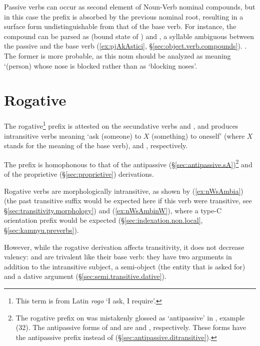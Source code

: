 Passive verbs can occur as second element of Noun-Verb nominal compounds, but in this case the  prefix is absorbed by the previous nominal root, resulting in a surface form undistinguishable from that of the base verb. For instance, the compound  can be parsed as  (bound state of  ) and , a syllable ambiguous between the passive  and the base verb   (\ref{ex:pjAkAstici}, §\ref{sec:object.verb.compounds}). . The former is more probable, as this noun should be analyzed as meaning `(person) whose nose is blocked rather than as `blocking noses'.
 
\section{Rogative} \label{sec:rogative.derivation}
The rogative\footnote{This term is from Latin \textit{rogo} `I ask, I require'. }  prefix is attested on the secundative verbs  and , and produces intransitive verbs meaning `ask (someone) to $X$ (something) to oneself’ (where $X$ stands for the meaning of the base verb),  and  , respectively.

The  prefix is homophonous to that of the antipassive (§\ref{sec:antipassive.sA})\footnote{The rogative prefix on  was mistakenly glossed as `antipassive’ in \citet[215]{jacques12demotion}, example (32). The  antipassive forms of  and   are  and , respectively. These forms have the  antipassive prefix instead of  (§\ref{sec:antipassive.ditransitive}). } and of the proprietive (§\ref{sec:proprietive}) derivations.

Rogative verbs are morphologically intransitive, as shown by (\ref{ex:nWsAmbia}) (the past transitive suffix  would be expected here if this verb were transitive, see §\ref{sec:transitivity.morphology}) and (\ref{ex:nWsAmbinW}), where a type-C orientation prefix would be expected (§\ref{sec:indexation.non.local}, §\ref{sec:kamnyu.preverbs}). 

However, while the rogative derivation affects transitivity, it does not decrease valency:  and   are trivalent like their base verb: they have two arguments in addition to the intransitive subject, a semi-object (the entity that is asked for) and a dative argument (§\ref{sec:semi.transitive.dative}).

